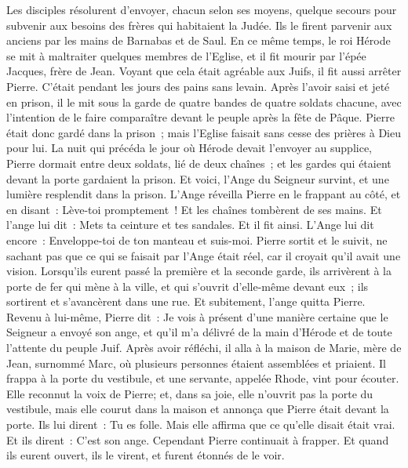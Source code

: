 \begin{multicols}{2}
Les disciples résolurent d'envoyer, chacun selon ses moyens, quelque secours pour subvenir aux besoins des frères qui habitaient la Judée.
Ils le firent parvenir aux anciens par les mains de Barnabas et de Saul.
\VerseOne{}En ce même temps, le roi Hérode se mit à maltraiter quelques membres de l'Eglise,
et il fit mourir par l'épée Jacques, frère de Jean.
Voyant que cela était agréable aux Juifs, il fit aussi arrêter Pierre. C'était pendant les jours des pains sans levain.
Après l'avoir saisi et jeté en prison, il le mit sous la garde de quatre bandes de quatre soldats chacune, avec l'intention de le faire comparaître devant le peuple après la fête de Pâque.
Pierre était donc gardé dans la prison~; mais l'Eglise faisait sans cesse des prières à Dieu pour lui.
La nuit qui précéda le jour où Hérode devait l'envoyer au supplice, Pierre dormait entre deux soldats, lié de deux chaînes~; et les gardes qui étaient devant la porte gardaient la prison.
Et voici, l'Ange du Seigneur survint, et une lumière resplendit dans la prison. L'Ange réveilla Pierre en le frappant au côté, et en disant~: Lève-toi promptement~! Et les chaînes tombèrent de ses mains.
Et l'ange lui dit~: Mets ta ceinture et tes sandales. Et il fit ainsi. L'Ange lui dit encore~: Enveloppe-toi de ton manteau et suis-moi.
Pierre sortit et le suivit, ne sachant pas que ce qui se faisait par l'Ange était réel, car il croyait qu'il avait une vision.
Lorsqu'ils eurent passé la première et la seconde garde, ils arrivèrent à la porte de fer qui mène à la ville, et qui s'ouvrit d'elle-même devant eux~; ils sortirent et s'avancèrent dans une rue. Et subitement, l'ange quitta Pierre.
Revenu à lui-même, Pierre dit~: Je vois à présent d'une manière certaine que le Seigneur a envoyé son ange, et qu'il m'a délivré de la main d'Hérode et de toute l'attente du peuple Juif.
Après avoir réfléchi, il alla à la maison de Marie, mère de Jean, surnommé Marc, où plusieurs personnes étaient assemblées et priaient.
Il frappa à la porte du vestibule, et une servante, appelée Rhode, vint pour écouter.
Elle reconnut la voix de Pierre; et, dans sa joie, elle n'ouvrit pas la porte du vestibule, mais elle courut dans la maison et annonça que Pierre était devant la porte.
Ils lui dirent~: Tu es folle. Mais elle affirma que ce qu'elle disait était vrai.
Et ils dirent~: C'est son ange. Cependant Pierre continuait à frapper. Et quand ils eurent ouvert, ils le virent, et furent étonnés de le voir.

\end{multicols}
